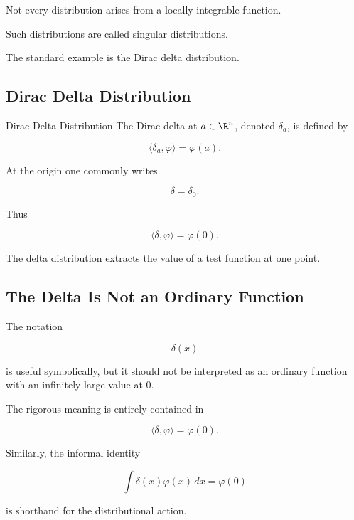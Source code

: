 Not every distribution arises from a locally integrable function.

Such distributions are called singular distributions.

The standard example is the Dirac delta distribution.

\subsection{Dirac Delta Distribution}
\label{subsec:dirac-delta}

\begin{definitionbox}{Dirac Delta Distribution}
The Dirac delta at \(a\in\R^n\), denoted \(\delta_a\), is defined by

\[
\boxed{
\langle\delta_a,\varphi\rangle
=
\varphi(a).
}
\]
\end{definitionbox}

At the origin one commonly writes

\[
\boxed{
\delta
=
\delta_0.
}
\]

Thus

\[
\boxed{
\langle\delta,\varphi\rangle
=
\varphi(0).
}
\]

The delta distribution extracts the value of a test function at one
point.

\subsection{The Delta Is Not an Ordinary Function}
\label{subsec:delta-not-function}

The notation

\[
\delta(x)
\]

is useful symbolically, but it should not be interpreted as an ordinary
function with an infinitely large value at \(0\).

The rigorous meaning is entirely contained in

\[
\boxed{
\langle\delta,\varphi\rangle
=
\varphi(0).
}
\]

Similarly, the informal identity

\[
\int
\delta(x)\varphi(x)\,dx
=
\varphi(0)
\]

is shorthand for the distributional action.

